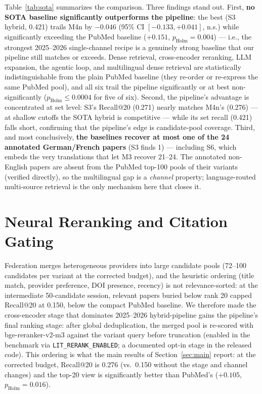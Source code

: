 \documentclass[nonacm,sigconf]{acmart}
\begin{document}
Table~\ref{tab:sota} summarizes the comparison. Three findings stand out.
First, \textbf{no SOTA baseline significantly outperforms the pipeline}:
the best (S3 hybrid, 0.421) trails M4n by $-0.046$ (95\% CI
$[-0.133, +0.041]$, n.s.) while significantly exceeding the PubMed
baseline ($+0.151$, $p_{\text{Holm}}{=}0.004$) --- i.e., the strongest
2025--2026 single-channel recipe is a genuinely strong baseline that our
pipeline still matches or exceeds. Dense retrieval, cross-encoder
reranking, LLM expansion, the agentic loop, and multilingual dense
retrieval are statistically indistinguishable from the plain PubMed
baseline (they re-order or re-express the same PubMed pool), and all six
trail the pipeline significantly or at best non-significantly
($p_{\text{Holm}} \le 0.0004$ for five of six). Second, the pipeline's
advantage is concentrated at set level: S3's Recall@20 (0.271) nearly
matches M4n's (0.276) --- at shallow cutoffs the SOTA hybrid is
competitive --- while its set recall (0.421) falls short, confirming that
the pipeline's edge is candidate-pool coverage. Third, and most
conclusively, \textbf{the baselines recover at most one of the 24
annotated German/French papers} (S3 finds 1) --- including S6, which
embeds the very translations that let M3 recover 21--24. The annotated
non-English papers are absent from the PubMed top-100 pools of their
variants (verified directly), so the multilingual gap is a
\emph{channel} property; language-routed multi-source retrieval is the
only mechanism here that closes it.

\section{Neural Reranking and Citation Gating}
\label{sec:rerank}

Federation merges heterogeneous providers into large candidate pools
(72--100 candidates per variant at the corrected budget), and the
heuristic ordering (title match, provider preference, DOI presence,
recency) is not relevance-sorted: at the intermediate 50-candidate
session, relevant papers buried below rank 20 capped Recall@20 at 0.150,
below the compact PubMed baseline. We therefore made the cross-encoder
stage that dominates 2025--2026 hybrid-pipeline gains the pipeline's
final ranking stage: after global deduplication, the merged pool is
re-scored with bge-reranker-v2-m3 against the variant query before
truncation (enabled in the benchmark via \texttt{LIT\_RERANK\_ENABLED};
a documented opt-in stage in the released code). This ordering is what
the main results of Section~\ref{sec:main} report: at the corrected
budget, Recall@20 is 0.276 (vs.\ 0.150 without the stage and channel
changes) and the top-20 view is significantly better than PubMed's
($+0.105$, $p_{\text{Holm}}{=}0.016$).
\end{document}
